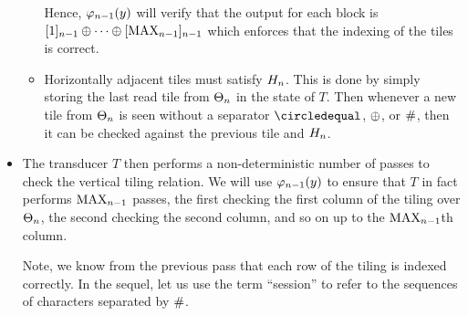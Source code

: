 \begin{itemize}
\begin{itemize}
        Hence,
        $\goodnums{\expheight-1}{y}$
        will verify that the output for each block is
        $\tenc{\expheight-1}{1}
         \numplus \cdots \numplus
         \tenc{\expheight-1}{\nmax{\expheight-1}}$
        which enforces that the indexing of the tiles is correct.

    \item
        Horizontally adjacent tiles must satisfy
        $\hrelnum{\expheight}$.
        This is done by simply storing the last read tile from
        $\tilesnum{\expheight}$
        in the state of $T$.
        Then whenever a new tile from
        $\tilesnum{\expheight}$
        is seen without a separator $\numeq$, $\numplus$, or $\numsep$, then it can be checked against the previous tile and
        $\hrelnum{\expheight}$.
    \end{itemize}

\item
    The transducer $T$ then performs a non-deterministic number of passes to check the vertical tiling relation.
    We will use
    $\goodnums{\expheight-1}{y}$
    to ensure that $T$ in fact performs
    $\nmax{\expheight-1}$
    passes, the first checking the first column of the tiling over
    $\tilesnum{\expheight}$,
    the second checking the second column, and so on up to the
    $\nmax{\expheight-1}$th column.

    Note, we know from the previous pass that each row of the tiling is indexed correctly.
    In the sequel, let us use the term ``session'' to refer to the sequences of characters separated by $\numsep$.


\end{itemize}
